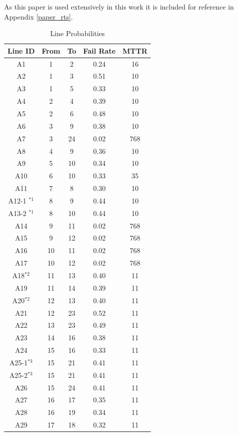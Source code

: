\documentclass[a4paper,oneside,12pt]{report}
\newcommand{\superscript}[1]{\tiny \ensuremath{^{\textrm{#1}}}}
\begin{document}
As this paper is used extensively in this work it is included for reference in Appendix \ref{paper_rts}.


\begin{table}[htbp]
\caption{Line Probabilities}
\label{table_line}
\centering
\begin{tabular}{c||c||c||c||c}
\bfseries Line ID & \bfseries From & \bfseries To & \bfseries Fail Rate & \bfseries MTTR \\
\hline \hline
A1 & 1 & 2 & 0.24 & 16 \\
A2 & 1 & 3 & 0.51 & 10 \\
A3 & 1 & 5 & 0.33 & 10 \\
A4 & 2 & 4 & 0.39 & 10 \\
A5 & 2 & 6 & 0.48 & 10 \\
A6 & 3 & 9 & 0.38 & 10 \\
A7 & 3 & 24 & 0.02 & 768 \\
A8 & 4 & 9 & 0.36 & 10 \\
A9 & 5 & 10 & 0.34 & 10 \\
A10 & 6 & 10 & 0.33 & 35 \\
A11 & 7 & 8 & 0.30 & 10 \\
A12-1 \superscript{*1} & 8 & 9 & 0.44 & 10 \\
A13-2 \superscript{*1} & 8 & 10 & 0.44 & 10 \\
A14 & 9 & 11 & 0.02 & 768 \\
A15 & 9 & 12 & 0.02 & 768 \\
A16 & 10 & 11 & 0.02 & 768 \\
A17 & 10 & 12 & 0.02 & 768 \\
A18\superscript{*2} & 11 & 13 & 0.40 & 11 \\
A19 & 11 & 14 & 0.39 & 11 \\
A20\superscript{*2} & 12 & 13 & 0.40 & 11 \\
A21 & 12 & 23 & 0.52 & 11 \\
A22 & 13 & 23 & 0.49 & 11 \\
A23 & 14 & 16 & 0.38 & 11 \\
A24 & 15 & 16 & 0.33 & 11 \\
A25-1\superscript{*3} & 15 & 21 & 0.41 & 11 \\
A25-2\superscript{*3} & 15 & 21 & 0.41 & 11 \\
A26 & 15 & 24 & 0.41 & 11 \\
A27 & 16 & 17 & 0.35 & 11 \\
A28 & 16 & 19 & 0.34 & 11 \\
A29 & 17 & 18 & 0.32 & 11 \\

\end{tabular}
\end{table}
\end{document}
